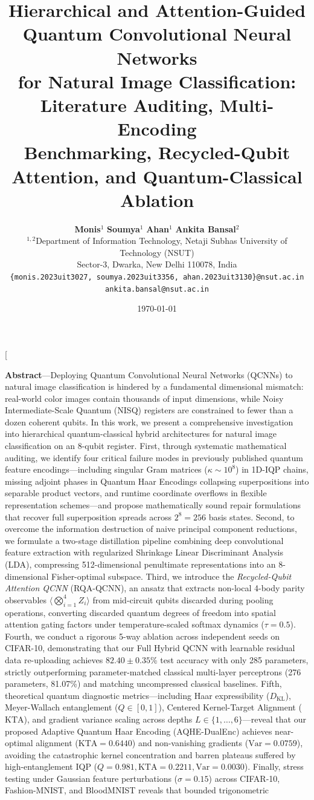 \documentclass[10pt,twocolumn,twoside,a4paper]{article}
\title{\vspace{-0.5cm}\textbf{\Large Hierarchical and Attention-Guided Quantum Convolutional Neural Networks}\\[3pt]
\textbf{\Large for Natural Image Classification: Literature Auditing, Multi-Encoding}\\[3pt]
\textbf{\Large Benchmarking, Recycled-Qubit Attention, and Quantum-Classical Ablation}}
\author{
\textbf{Monis}$^{1}$ \qquad \textbf{Soumya}$^{1}$ \qquad \textbf{Ahan}$^{1}$ \qquad \textbf{Ankita Bansal}$^{2}$\\[4pt]
\small $^{1,2}$Department of Information Technology, Netaji Subhas University of Technology (NSUT)\\[2pt]
\small Sector-3, Dwarka, New Delhi 110078, India\\[3pt]
\small \texttt{\{monis.2023uit3027, soumya.2023uit3356, ahan.2023uit3130\}@nsut.ac.in}\\[2pt]
\small \texttt{ankita.bansal@nsut.ac.in}
}
\date{\today}
\begin{document}
\twocolumn[{%
  \maketitle
  \thispagestyle{plain}
  \vspace{-0.4cm}
  \begin{center}
    \begin{minipage}{0.92\textwidth}
      \small
      \textbf{Abstract}---Deploying Quantum Convolutional Neural Networks (QCNNs) to natural image classification is hindered by a fundamental dimensional mismatch: real-world color images contain thousands of input dimensions, while Noisy Intermediate-Scale Quantum (NISQ) registers are constrained to fewer than a dozen coherent qubits. In this work, we present a comprehensive investigation into hierarchical quantum-classical hybrid architectures for natural image classification on an 8-qubit register. First, through systematic mathematical auditing, we identify four critical failure modes in previously published quantum feature encodings---including singular Gram matrices ($\kappa \sim 10^8$) in 1D-IQP chains, missing adjoint phases in Quantum Haar Encodings collapsing superpositions into separable product vectors, and runtime coordinate overflows in flexible representation schemes---and propose mathematically sound repair formulations that recover full superposition spreads across $2^8 = 256$ basis states. Second, to overcome the information destruction of naive principal component reductions, we formulate a two-stage distillation pipeline combining deep convolutional feature extraction with regularized Shrinkage Linear Discriminant Analysis (LDA), compressing 512-dimensional penultimate representations into an 8-dimensional Fisher-optimal subspace. Third, we introduce the \textit{Recycled-Qubit Attention QCNN} (RQA-QCNN), an ansatz that extracts non-local 4-body parity observables $\langle \bigotimes_{i=1}^4 Z_i \rangle$ from mid-circuit qubits discarded during pooling operations, converting discarded quantum degrees of freedom into spatial attention gating factors under temperature-scaled softmax dynamics ($\tau=0.5$). Fourth, we conduct a rigorous 5-way ablation across independent seeds on CIFAR-10, demonstrating that our Full Hybrid QCNN with learnable residual data re-uploading achieves $82.40 \pm 0.35$\% test accuracy with only 285 parameters, strictly outperforming parameter-matched classical multi-layer perceptrons (276 parameters, 81.07\%) and matching uncompressed classical baselines. Fifth, theoretical quantum diagnostic metrics---including Haar expressibility ($D_{\text{KL}}$), Meyer-Wallach entanglement ({$Q \in [0, 1]$}), Centered Kernel-Target Alignment ($\text{KTA}$), and gradient variance scaling across depths {$L \in \{1, \dots, 6\}$}---reveal that our proposed Adaptive Quantum Haar Encoding (AQHE-DualEnc) achieves near-optimal alignment ($\text{KTA}=0.6440$) and non-vanishing gradients ($\text{Var}=0.0759$), avoiding the catastrophic kernel concentration and barren plateaus suffered by high-entanglement IQP ($Q=0.981, \text{KTA}=0.2211, \text{Var}=0.0030$). Finally, stress testing under Gaussian feature perturbations ($\sigma=0.15$) across CIFAR-10, Fashion-MNIST, and BloodMNIST reveals that bounded trigonometric 
\end{minipage}
\end{center}}
\end{document}
